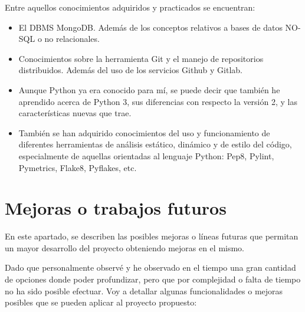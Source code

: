 Entre aquellos conocimientos adquiridos y practicados se encuentran:


\begin{itemize}
\item El DBMS MongoDB. Además de los conceptos relativos a bases de datos NO-SQL o no relacionales.

\item Conocimientos sobre la herramienta Git y el manejo de repositorios distribuidos. Además del uso de los servicios Github y Gitlab.

\item Aunque Python ya era conocido para mí, se puede decir que también he aprendido acerca de Python 3, sus diferencias con respecto la versión 2, y las características nuevas que trae.

\item También se han adquirido conocimientos del uso y funcionamiento de diferentes herramientas de análisis estático, dinámico y de estilo del código, especialmente de aquellas orientadas al lenguaje Python: Pep8, Pylint, Pymetrics, Flake8, Pyflakes, etc.

\end{itemize}

\newpage
\section{Mejoras o trabajos futuros}


En este apartado, se describen las posibles mejoras o líneas futuras que permitan un mayor desarrollo del proyecto obteniendo mejoras en el mismo.


Dado que personalmente observé y he observado en el tiempo una gran cantidad de opciones donde poder profundizar, pero que por complejidad o falta de tiempo no ha sido posible efectuar. Voy a detallar algunas funcionalidades o mejoras posibles que se pueden aplicar al proyecto propuesto:


